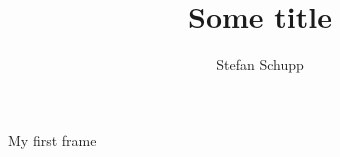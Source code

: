 \documentclass[]{beamer}
\title{Some title}
\author[Stefan Schupp]{Stefan Schupp}
\date{\DTMdisplaydate{2021}{7}{8}{-1}}
\begin{document}
\begin{frame}[plain]
\maketitle
    
\end{frame}

\begin{frame}{My first frame}
    
\end{frame}
\end{document}
